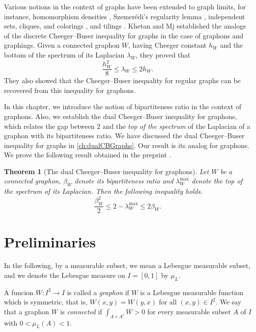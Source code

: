 \documentclass[12pt,a4paper,bold]{thesis}
\newtheorem{thm}{Theorem}[chapter]
\theoremstyle{definition}
\newcommand*{\map}[3]{#1 \colon #2 \to #3}
\begin{document}
Various notions in the context of graphs have been extended to graph limits, 
for instance, homomorphism densities \cite{Lovasz-Szegedy-limitsofDenseGraphs06},
Szemer\'edi's regularity lemma \cite{Lovasz-Szegedy-SzemerdiLemma07},
independent sets, cliques, and colorings \cite{IndSets-cliques-colorings20}, 
and tilings \cite{TilingsGraphons-21}.
Khetan and Mj \cite{Abhishek-Mahan24} established the analogs of the discrete
Cheeger--Buser inequality for graphs in the case of graphons and graphings. 
Given a connected graphon $W$, having Cheeger constant $h_W$ and 
the bottom of the spectrum of its Laplacian $\lambda_W$, they proved that
\begin{equation*}
    \frac{h_W^2}{8} \leq \lambda_W \leq 2 h_W.
\end{equation*}
They also showed that the Cheeger--Buser inequality for regular graphs 
can be recovered from this inequality for graphons. 

In this chapter, we introduce the notion of bipartiteness ratio in the context 
of graphons. Also, we establish the dual Cheeger--Buser inequality for graphons, 
which relates the gap between $2$ and the \emph{top of the spectrum} of the Laplacian 
of a graphon with its bipartiteness ratio. We have discussed the dual Cheeger--Buser 
inequality for graphs in \cref{ch:dualCBGraphs}. Our result is its analog for graphons.
We prove the following result obtained in the preprint \cite{Mugdha-duaCBGraphons25}.

\begin{thm}[The dual Cheeger--Buser inequality for graphons] \label{thm:main}
    Let $W$ be a connected graphon, $\beta_W$ denote its bipartiteness ratio and
    $\lambda_W^{\max}$ denote the top of the spectrum of its Laplacian. 
    Then the following inequality holds.
    \begin{equation*}
        \frac{\beta_W^2}{2} \leq 2 - \lambda_W^{\max} \leq 2 \beta_W.
    \end{equation*}
\end{thm}

\section{Preliminaries} \label{section:prelim}

In the following, by a measurable subset, we mean a Lebesgue measurable subset, 
and we denote the Lebesgue measure on $I = [0,1]$ by $\mu_L$.

A funcion $\map{W}{I^2}{I}$ is called a \emph{graphon} if $W$ is a Lebesgue measurable 
function which is symmetric, that is, $W(x,y) = W(y,x)$ for all $(x,y) \in I^2$. 
We say that a graphon $W$ is \emph{connected} if $\int_{A \times A^c} W > 0$
for every measurable subset $A$ of $I$ with $0 < \mu_L(A) < 1$.
\end{document}
